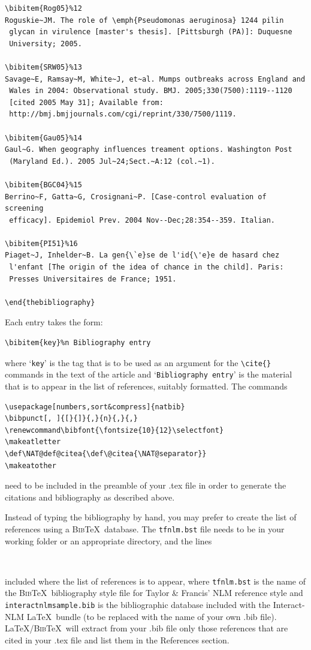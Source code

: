 \documentclass[]{interact}
\makeatletter
\renewcommand\bibfont{\fontsize{10}{12}\selectfont}%
\def\NAT@def@citea{\def\@citea{\NAT@separator}}%
\theoremstyle{plain}%
\theoremstyle{definition}
\theoremstyle{remark}
\makeatother
\begin{document}
\begin{verbatim}
\bibitem{Rog05}%12
Roguskie~JM. The role of \emph{Pseudomonas aeruginosa} 1244 pilin
 glycan in virulence [master's thesis]. [Pittsburgh (PA)]: Duquesne
 University; 2005.

\bibitem{SRW05}%13
Savage~E, Ramsay~M, White~J, et~al. Mumps outbreaks across England and
 Wales in 2004: Observational study. BMJ. 2005;330(7500):1119--1120
 [cited 2005 May 31]; Available from:
 http://bmj.bmjjournals.com/cgi/reprint/330/7500/1119.

\bibitem{Gau05}%14
Gaul~G. When geography influences treament options. Washington Post
 (Maryland Ed.). 2005 Jul~24;Sect.~A:12 (col.~1).

\bibitem{BGC04}%15
Berrino~F, Gatta~G, Crosignani~P. [Case-control evaluation of screening
 efficacy]. Epidemiol Prev. 2004 Nov--Dec;28:354--359. Italian.

\bibitem{PI51}%16
Piaget~J, Inhelder~B. La gen{\`e}se de l'id{\'e}e de hasard chez
 l'enfant [The origin of the idea of chance in the child]. Paris:
 Presses Universitaires de France; 1951.

\end{thebibliography}
\end{verbatim}
\bigskip
\noindent Each entry takes the form:
\begin{verbatim}
\bibitem{key}%n Bibliography entry
\end{verbatim}
where `\texttt{key}' is the tag that is to be used as an argument for the \verb"\cite{}" commands in the text of the article and `\texttt{Bibliography entry}' is the material that is to appear in the list of references, suitably formatted. The commands
\begin{verbatim}
\usepackage[numbers,sort&compress]{natbib}
\bibpunct[, ]{[}{]}{,}{n}{,}{,}
\renewcommand\bibfont{\fontsize{10}{12}\selectfont}
\makeatletter
\def\NAT@def@citea{\def\@citea{\NAT@separator}}
\makeatother
\end{verbatim}
need to be included in the preamble of your .tex file in order to generate the citations and bibliography as described above.

Instead of typing the bibliography by hand, you may prefer to create the list of references using a \textsc{Bib}\TeX\ database. The \texttt{tfnlm.bst} file needs to be in your working folder or an appropriate directory, and the lines
\begin{verbatim}


\end{verbatim}
included where the list of references is to appear, where \texttt{tfnlm.bst} is the name of the \textsc{Bib}\TeX\ bibliography style file for Taylor \& Francis' NLM reference style and \texttt{interactnlmsample.bib} is the bibliographic database included with the \textsf{Interact}-NLM \LaTeX\ bundle (to be replaced with the name of your own .bib file). \LaTeX/\textsc{Bib}\TeX\ will extract from your .bib file only those references that are cited in your .tex file and list them in the References section.
\end{document}
